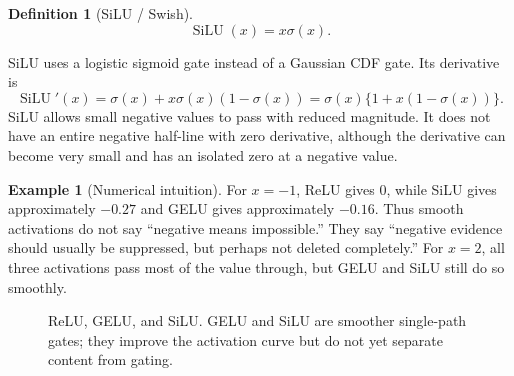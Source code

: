 \documentclass[11pt,a4paper]{article}
\theoremstyle{definition}
\newtheorem{definition}{Definition}[section]
\newtheorem{example}{Example}[section]
\theoremstyle{plain}
\DeclareMathOperator{\SiLU}{SiLU}
\begin{document}
\begin{definition}[SiLU / Swish]
\begin{equation}\label{eq:silu}
    \SiLU(x)=x\sigma(x).
\end{equation}
\end{definition}

SiLU uses a logistic sigmoid gate instead of a Gaussian CDF gate. Its derivative is
\begin{equation}\label{eq:silu_derivative}
    \SiLU'(x)=\sigma(x)+x\sigma(x)(1-\sigma(x))
    =\sigma(x)\{1+x(1-\sigma(x))\}.
\end{equation}
SiLU allows small negative values to pass with reduced magnitude. It does not have an entire negative half-line with zero derivative, although the derivative can become very small and has an isolated zero at a negative value.

\begin{example}[Numerical intuition]
For $x=-1$, ReLU gives $0$, while SiLU gives approximately $-0.27$ and GELU gives approximately $-0.16$. Thus smooth activations do not say ``negative means impossible.'' They say ``negative evidence should usually be suppressed, but perhaps not deleted completely.'' For $x=2$, all three activations pass most of the value through, but GELU and SiLU still do so smoothly.
\end{example}

\begin{figure}[H]
\centering
{}
\caption{ReLU, GELU, and SiLU. GELU and SiLU are smoother single-path gates; they improve the activation curve but do not yet separate content from gating.}
\label{fig:relu-gelu-silu-shapes}
\end{figure}
\end{document}

